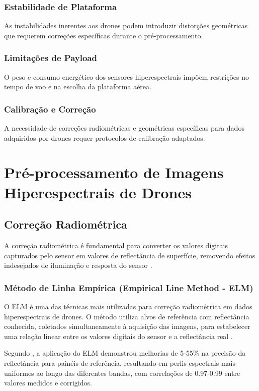 \subsubsection{Estabilidade de Plataforma}
As instabilidades inerentes aos drones podem introduzir distorções geométricas que requerem correções específicas durante o pré-processamento.

\subsubsection{Limitações de Payload}
O peso e consumo energético dos sensores hiperespectrais impõem restrições no tempo de voo e na escolha da plataforma aérea.

\subsubsection{Calibração e Correção}
A necessidade de correções radiométricas e geométricas específicas para dados adquiridos por drones requer protocolos de calibração adaptados.

\section{Pré-processamento de Imagens Hiperespectrais de Drones}\label{sec:preprocessamento}

\subsection{Correção Radiométrica}
A correção radiométrica é fundamental para converter os valores digitais capturados pelo sensor em valores de reflectância de superfície, removendo efeitos indesejados de iluminação e resposta do sensor \cite{Shin2024}.

\subsubsection{Método de Linha Empírica (Empirical Line Method - ELM)}
O ELM é uma das técnicas mais utilizadas para correção radiométrica em dados hiperespectrais de drones. O método utiliza alvos de referência com reflectância conhecida, coletados simultaneamente à aquisição das imagens, para estabelecer uma relação linear entre os valores digitais do sensor e a reflectância real \cite{Shin2024}.

Segundo \cite{Shin2024}, a aplicação do ELM demonstrou melhorias de 5-55\% na precisão da reflectância para painéis de referência, resultando em perfis espectrais mais uniformes ao longo das diferentes bandas, com correlações de 0.97-0.99 entre valores medidos e corrigidos.

